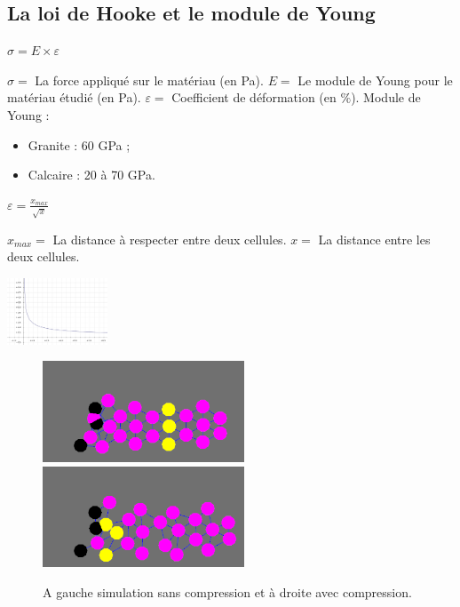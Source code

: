 \documentclass{beamer}
\begin{document}
\subsection{La loi de Hooke et le module de Young}
\begin{frame}
  \begin{center}
    $\sigma = E \times \varepsilon$
  \end{center}
  $\sigma = $ La force appliqué sur le matériau (en Pa). $E = $ Le module de Young pour le matériau étudié (en Pa). $\varepsilon = $ Coefficient de déformation (en $\%$). \smallbreak
  Module de Young :
  \begin{itemize}
    \item Granite : 60 GPa ;
    \item Calcaire : 20 à 70 GPa.
  \end{itemize}
  \smallbreak
  \begin{center}
    $\varepsilon = \frac{x_{max}}{\sqrt{x}}$
  \end{center}
  $x_{max} = $ La distance à respecter entre deux cellules. $x = $ La distance entre les deux cellules. \smallbreak
  \begin{center}
    \includegraphics[width=3cm]{Images/compression_kmplot.png}
  \end{center}
\end{frame}

\begin{frame}
  \begin{figure}
    \begin{center}
      \includegraphics[width=6cm]{Images/no_compression.png}
      \includegraphics[width=6cm]{Images/compression.png}
    \end{center}
    \caption{A gauche simulation sans compression et à droite avec compression.}
  \end{figure}
\end{frame}
\end{document}
